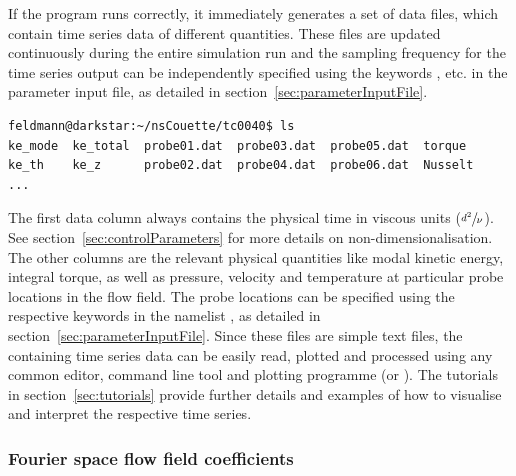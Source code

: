 \documentclass[a4paper, 11pt, DIV=11]{scrartcl}
\begin{document}
If the program runs correctly, it immediately generates a set of data
files, which contain time series data of different quantities. These
files are updated continuously during the entire simulation run and
the sampling frequency for the time series output can be independently
specified using the keywords ,  etc. in the
parameter input file, as detailed in section~\ref{sec:parameterInputFile}.
\begin{lstlisting}[language=bash]
feldmann@darkstar:~/nsCouette/tc0040$ ls
ke_mode  ke_total  probe01.dat  probe03.dat  probe05.dat  torque
ke_th    ke_z      probe02.dat  probe04.dat  probe06.dat  Nusselt
...
\end{lstlisting}
The first data column always contains the physical time in viscous units
($\sfrac{d^2}{\nu}$). See section~\ref{sec:controlParameters} for more
details on non-dimensionalisation. The other columns are the relevant
physical quantities like modal kinetic energy, integral torque, as well
as pressure, velocity and temperature at particular probe locations in the
flow field. The probe locations can be specified using the respective
keywords in the namelist , as detailed in
section~\ref{sec:parameterInputFile}. Since these files are simple
text files, the containing time series data can be easily read, plotted and
processed using any common editor, command line tool and plotting
programme (\eg \gnuplot or ). The tutorials in
section~\ref{sec:tutorials} provide further details and examples of how
to visualise and interpret the respective time series.

\subsubsection{Fourier space flow field coefficients}
\label{sec:ioCoeff}
\end{document}
